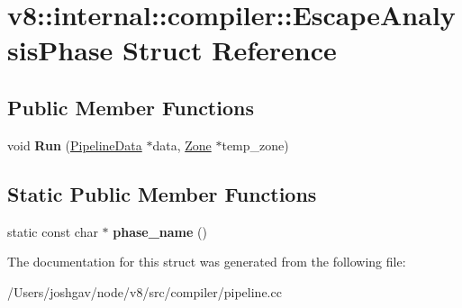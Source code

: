 \hypertarget{structv8_1_1internal_1_1compiler_1_1_escape_analysis_phase}{}\section{v8\+:\+:internal\+:\+:compiler\+:\+:Escape\+Analysis\+Phase Struct Reference}
\label{structv8_1_1internal_1_1compiler_1_1_escape_analysis_phase}
\subsection*{Public Member Functions}
\begin{DoxyCompactItemize}
\item 
void {\bfseries Run} (\hyperlink{classv8_1_1internal_1_1compiler_1_1_pipeline_data}{Pipeline\+Data} $\ast$data, \hyperlink{classv8_1_1internal_1_1_zone}{Zone} $\ast$temp\+\_\+zone)\hypertarget{structv8_1_1internal_1_1compiler_1_1_escape_analysis_phase_ae858efbea3b7cd856c2788428dcc98c9}{}\label{structv8_1_1internal_1_1compiler_1_1_escape_analysis_phase_ae858efbea3b7cd856c2788428dcc98c9}

\end{DoxyCompactItemize}
\subsection*{Static Public Member Functions}
\begin{DoxyCompactItemize}
\item 
static const char $\ast$ {\bfseries phase\+\_\+name} ()\hypertarget{structv8_1_1internal_1_1compiler_1_1_escape_analysis_phase_a4a9d396329e6d5a939fb3bb49709cb5e}{}\label{structv8_1_1internal_1_1compiler_1_1_escape_analysis_phase_a4a9d396329e6d5a939fb3bb49709cb5e}

\end{DoxyCompactItemize}


The documentation for this struct was generated from the following file\+:\begin{DoxyCompactItemize}
\item 
/\+Users/joshgav/node/v8/src/compiler/pipeline.\+cc\end{DoxyCompactItemize}
